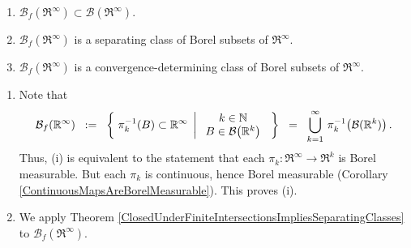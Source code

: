 \begin{theorem}
\mbox{}
\begin{enumerate}
\item	$\mathcal{B}_{f}\!\left(\Re^{\infty}\right) \subset \mathcal{B}\!\left(\Re^{\infty}\right)$.
\item	$\mathcal{B}_{f}\!\left(\Re^{\infty}\right)$ is a separating class of Borel subsets of $\Re^{\infty}$.
\item	$\mathcal{B}_{f}\!\left(\Re^{\infty}\right)$ is a convergence-determining class of Borel subsets of $\Re^{\infty}$.
\end{enumerate}
\end{theorem}
\proof
\begin{enumerate}
\item
	Note that
	\begin{equation*}
	\mathcal{B}_{f}\!\left(\mathbb{R}^{\infty}\right)
	\;\; := \;\;
	\left\{\;
	\pi_{k}^{-1}\!\left(B\right) \subset \mathbb{R}^{\infty}
	\;\left\vert\;
	\begin{array}{c}
	k \in \mathbb{N}
	\\
	B \in \mathcal{B}\!\left(\mathbb{R}^{k}\right)
	\end{array}
	\right.
	\;\right\}
	\;\; = \;\;
	\bigcup_{k=1}^{\infty}\,\pi_{k}^{-1}\!\left(\mathcal{B}(\mathbb{R}^{k})\right).
	\end{equation*}
	Thus, (i) is equivalent to the statement that each $\pi_{k} : \Re^{\infty} \longrightarrow \Re^{k}$ is
	Borel measurable.
	But each $\pi_{k}$ is continuous, hence Borel measurable (Corollary \ref{ContinuousMapsAreBorelMeasurable}).
	This proves (i).
\item
	We apply
	Theorem \ref{ClosedUnderFiniteIntersectionsImpliesSeparatingClasses}
	to $\mathcal{B}_{f}\!\left(\Re^{\infty}\right)$.


\end{enumerate}
